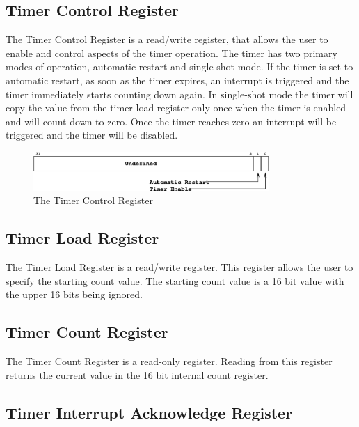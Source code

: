 \documentclass[a4paper,10pt]{article}
\begin{document}
\subsection{Timer Control Register}

The Timer Control Register is a read/write register, that allows the
user to enable and control aspects of the timer operation. The timer
has two primary modes of operation, automatic restart and single-shot
mode. If the timer is set to automatic restart, as soon as the timer
expires, an interrupt is triggered and the timer immediately starts
counting down again. In single-shot mode the timer will copy the value
from the timer load register only once when the timer is enabled and
will count down to zero. Once the timer reaches zero an interrupt will
be triggered and the timer will be disabled.

\begin{figure}[h]
\begin{center}
\includegraphics[width=0.8\textwidth]{timer_cr.eps}
\caption{The Timer Control Register}
\label{timer_cr_pic}
\end{center}
\end{figure}

\subsection{Timer Load Register}

The Timer Load Register is a read/write register. This register allows
the user to specify the starting count value. The starting count value
is a 16 bit value with the upper 16 bits being ignored.

\subsection{Timer Count Register}

The Timer Count Register is a read-only register. Reading from this
register returns the current value in the 16 bit internal count
register.

\subsection{Timer Interrupt Acknowledge Register}
\end{document}
